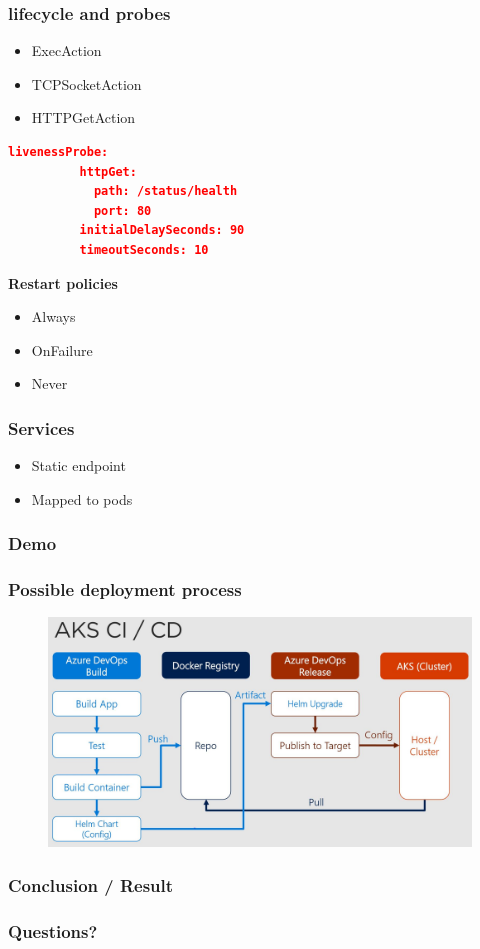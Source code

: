 \documentclass{beamer}
\begin{document}
\begin{frame}[fragile]
\frametitle{lifecycle and probes}
\begin{itemize}
    \item ExecAction
    \item TCPSocketAction
    \item HTTPGetAction
\end{itemize}
    \begin{lstlisting}[language=json,firstnumber=1]
    livenessProbe:
          httpGet:
            path: /status/health
            port: 80
          initialDelaySeconds: 90
          timeoutSeconds: 10
\end{lstlisting}
\textbf{Restart policies}
\begin{itemize}
    \item Always
    \item OnFailure
    \item Never
\end{itemize}
\end{frame}


\begin{frame}
\frametitle{Services}
\begin{itemize}
    \item Static endpoint
    \item Mapped to pods
\end{itemize}
    
\end{frame}


\begin{frame}
\frametitle{Demo}
    
\end{frame}

\begin{frame}
    \frametitle{Possible deployment process}
        \begin{figure}
            \includegraphics[width=\linewidth]{images/process.JPG}
        \end{figure}
    \end{frame}

\begin{frame}
\frametitle{Conclusion / Result}
    
\end{frame}

\begin{frame}
\frametitle{Questions?}
    
\end{frame}
\end{document}
